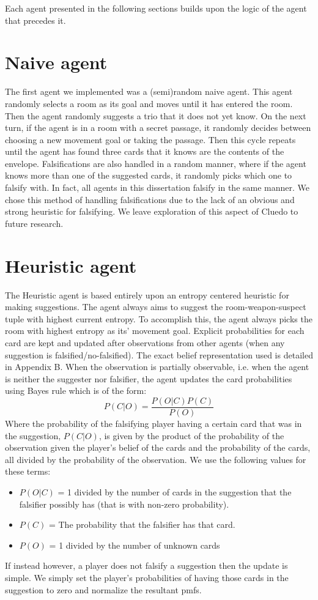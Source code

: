 \documentclass[msc, ai, twoside, notimes, logo, parskip, leftchapter, normalheadings]{infthesis}
\begin{document}
Each agent presented in the following sections builds upon the logic of the agent that precedes it. 

\section{Naive agent}
The first agent we implemented was a (semi)random naive agent. This agent randomly selects a room as its goal and moves until it has entered the room. Then the agent randomly suggests a trio that it does not yet know. On the next turn, if the agent is in a room with a secret passage, it randomly decides between choosing a new movement goal or taking the passage. Then this cycle repeats until the agent has found three cards that it knows are the contents of the envelope. Falsifications are also handled in a random manner, where if the agent knows more than one of the suggested cards, it randomly picks which one to falsify with. In fact, all agents in this dissertation falsify in the same manner. We chose this method of handling falsifications due to the lack of an obvious and strong heuristic for falsifying. We leave exploration of this aspect of Cluedo to future research.

\section{Heuristic agent}
The Heuristic agent is based entirely upon an entropy centered heuristic for making suggestions. The agent always aims to suggest the room-weapon-suspect tuple with highest current entropy. To accomplish this, the agent always picks the room with highest entropy as its' movement goal. Explicit probabilities for each card are kept and updated after observations from other agents (when any suggestion is falsified/no-falsified). The exact belief representation used is detailed in Appendix B. When the observation is partially observable, i.e. when the agent is neither the suggester nor falsifier, the agent updates the card probabilities using Bayes rule which is of the form:
\begin{equation}
P(C|O) = \frac{P(O|C) P(C)}{P(O)}
\end{equation}
Where the probability of the falsifying player having a certain card that was in the suggestion, \(P(C|O)\), is given by the product of the probability of the observation given the player's belief of the cards and the probability of the cards, all divided by the probability of the observation. We use the following values for these terms:
\begin{itemize}
\item \(P(O|C)\) = 1 divided by the number of cards in the suggestion that the falsifier possibly has (that is with non-zero probability).
\item \(P(C)\) = The probability that the falsifier has that card.
\item \(P(O)\) = 1 divided by the number of unknown cards
\end{itemize}
If instead however, a player does not falsify a suggestion then the update is simple. We simply set the player's probabilities of having those cards in the suggestion to zero and normalize the resultant pmfs.
\end{document}
